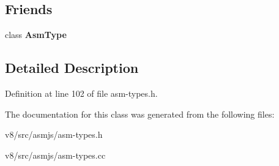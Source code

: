 \subsection*{Friends}
\begin{DoxyCompactItemize}
\item 
\mbox{\label{classv8_1_1internal_1_1wasm_1_1AsmCallableType_a1e63eeb293d5ca2da4a3eca09d76d5af}} 
class {\bfseries Asm\+Type}
\end{DoxyCompactItemize}


\subsection{Detailed Description}


Definition at line 102 of file asm-\/types.\+h.



The documentation for this class was generated from the following files\+:\begin{DoxyCompactItemize}
\item 
v8/src/asmjs/asm-\/types.\+h\item 
v8/src/asmjs/asm-\/types.\+cc\end{DoxyCompactItemize}
